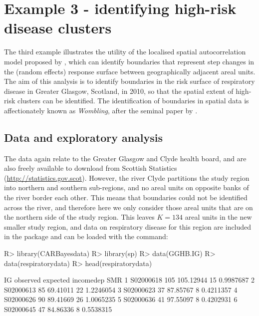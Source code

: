 \documentclass[article,shortnames,nojss]{jss}
\begin{document}
\section{Example 3 - identifying high-risk disease clusters}
The third example illustrates the utility of the localised spatial autocorrelation model proposed by \cite{lee2012}, which can identify boundaries that represent step changes in the (random effects) response surface between geographically adjacent areal units. The aim of this analysis is to identify boundaries in the risk surface of respiratory disease in Greater Glasgow, Scotland, in 2010, so that the spatial extent of high-risk clusters can be identified. The identification of boundaries in spatial data is affectionately known as \emph{Wombling}, after the seminal paper by \cite{womble1951}. 


\subsection{Data and exploratory analysis}
The data again relate to the Greater Glasgow and Clyde health board, and are also freely available to download from  Scottish Statistics (\url{http://statistics.gov.scot}). However, the river Clyde partitions the study region into northern and southern sub-regions, and no areal units on opposite banks of the river border each other. This means that boundaries could not be identified across the river, and therefore here we only consider those areal units that are on the northern side of the study region. This leaves $K=134$ areal units in the new smaller study region, and data on respiratory disease for this region are included in the  package and can be loaded with the command:


\begin{Schunk}
\begin{Sinput}
R> library(CARBayesdata)
R> library(sp)
R> data(GGHB.IG)
R> data(respiratorydata)
R> head(respiratorydata)
\end{Sinput}
\begin{Soutput}
         IG observed  expected incomedep       SMR
1 S02000618      105 105.12944        15 0.9987687
2 S02000613       85  69.41011        22 1.2246054
3 S02000623       37  87.85767         8 0.4211357
4 S02000626       90  89.41669        26 1.0065235
5 S02000636       41  97.55097         8 0.4202931
6 S02000645       47  84.86336         8 0.5538315
\end{Soutput}
\end{Schunk}
\end{document}
